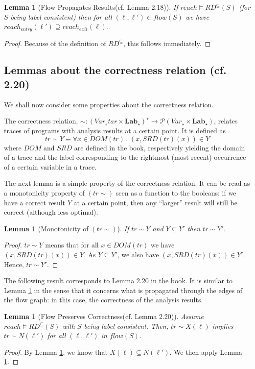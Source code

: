 \documentclass[a4wide,12pt]{article}
\theoremstyle{definition}
\theoremstyle{plain}
\newtheorem{lemma}[theo]{Lemma}
\theoremstyle{remark}
\def\pset#1{\mathcal{P}(#1)}
\def\Lab {\mathbf{Lab}}
\begin{document}
\begin{lemma}[Flow Propagates Results(cf. Lemma 2.18)]
\label{lem218}
If $reach \models RD^\subseteq(S)$ (for $S$ being label consistent) then for all
$(\ell, \ell') \in flow(S)$ we have $reach_{entry}(\ell') \supseteq reach_{exit}(\ell)$.
\end{lemma}
\begin{proof}
Because of the definition of $RD^\subseteq$, this follows
immediately.
\end{proof}

\subsection*{Lemmas about the correctness relation (cf. 2.20) }

We shall now consider some properties about the correctness relation.


The correctness relation, $\sim: (Var_star \times \Lab_\star)^\star \to \pset{Var_\star \times \Lab_\star}$,
relates traces of programs with analysis results at a certain point. It is defined as
\[tr \sim Y \equiv \forall x \in DOM(tr) \,.\; (x,SRD(tr)(x)) \in Y\]
where $DOM$ and $SRD$ are defined in the book, respectively yielding
the domain of a trace and the label corresponding to the rightmost (most recent) 
occurrence of a certain variable in a trace.

The next lemma is a simple property of the correctness relation. It can be read as a monotonicity property
of $(tr \sim)$ seen as a function to the booleans: if we have a
correct result $Y$ at a certain point, then any ``larger'' result
will still be correct (although less optimal). 

\begin{lemma}[Monotonicity of $(tr \sim)$]
\label{lemmasq}
If $tr \sim Y$ and $Y \subseteq Y'$ then $tr \sim Y'$.
\end{lemma}
\begin{proof}
$tr \sim Y$ means that for all $x \in DOM (tr)$ we have $(x,SRD(tr)(x)) \in Y$. 
As $Y \subseteq Y'$, we also have $(x,SRD(tr)(x)) \in Y'$. Hence, $tr \sim Y'$.
\end{proof}

The following result corresponds to Lemma 2.20 in the book. 
It is similar to Lemma \ref{lem218} in the sense that it concerns what is propagated
through the edges of the flow graph: in this case, the correctness of the analysis results.

\begin{lemma}[Flow Preserves Correctness(cf. Lemma 2.20)]\label{lemmaflow}
Assume $reach \models RD^\subseteq(S)$ with $S$ being label consistent. Then,
$tr \sim X(\ell)$ implies $tr \sim N(\ell')$ for all $(\ell, \ell')$ in $flow(S)$.
\end{lemma}
\begin{proof}
By Lemma \ref{lem218}, we know that $X(\ell) \subseteq N(\ell')$. We then apply Lemma \ref{lemmasq}.
\end{proof}
\end{document}
